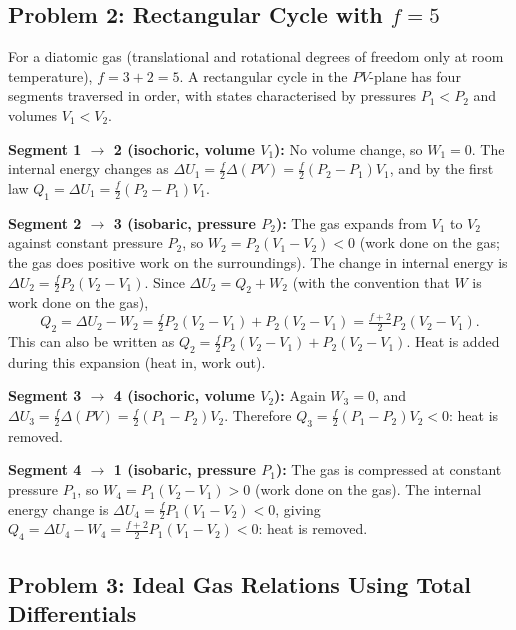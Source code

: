 \subsection{Problem 2: Rectangular Cycle with $f = 5$}

For a diatomic gas (translational and rotational degrees of freedom only at room temperature), $f = 3 + 2 = 5$. A rectangular cycle in the $PV$-plane has four segments traversed in order, with states characterised by pressures $P_1 < P_2$ and volumes $V_1 < V_2$.

\textbf{Segment 1 $\to$ 2 (isochoric, volume $V_1$):}
No volume change, so $W_1 = 0$. The internal energy changes as
$\Delta U_1 = \tfrac{f}{2}\Delta(PV) = \tfrac{f}{2}(P_2 - P_1)V_1$,
and by the first law $Q_1 = \Delta U_1 = \tfrac{f}{2}(P_2 - P_1)V_1$.

\textbf{Segment 2 $\to$ 3 (isobaric, pressure $P_2$):}
The gas expands from $V_1$ to $V_2$ against constant pressure $P_2$, so $W_2 = P_2(V_1 - V_2) < 0$ (work done on the gas; the gas does positive work on the surroundings). The change in internal energy is $\Delta U_2 = \tfrac{f}{2}P_2(V_2 - V_1)$. Since $\Delta U_2 = Q_2 + W_2$ (with the convention that $W$ is work done on the gas),
\begin{equation}
    Q_2 = \Delta U_2 - W_2 = \tfrac{f}{2}P_2(V_2 - V_1) + P_2(V_2 - V_1) = \tfrac{f+2}{2}P_2(V_2 - V_1).
\end{equation}
This can also be written as $Q_2 = \tfrac{f}{2}P_2(V_2 - V_1) + P_2(V_2 - V_1)$. Heat is added during this expansion (heat in, work out).

\textbf{Segment 3 $\to$ 4 (isochoric, volume $V_2$):}
Again $W_3 = 0$, and $\Delta U_3 = \tfrac{f}{2}\Delta(PV) = \tfrac{f}{2}(P_1 - P_2)V_2$. Therefore $Q_3 = \tfrac{f}{2}(P_1 - P_2)V_2 < 0$: heat is removed.

\textbf{Segment 4 $\to$ 1 (isobaric, pressure $P_1$):}
The gas is compressed at constant pressure $P_1$, so $W_4 = P_1(V_2 - V_1) > 0$ (work done on the gas). The internal energy change is $\Delta U_4 = \tfrac{f}{2}P_1(V_1 - V_2) < 0$, giving $Q_4 = \Delta U_4 - W_4 = \tfrac{f+2}{2}P_1(V_1 - V_2) < 0$: heat is removed.

\subsection{Problem 3: Ideal Gas Relations Using Total Differentials}

